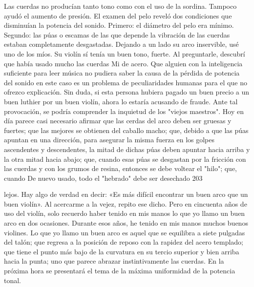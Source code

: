 Las cuerdas no producían tanto tono como con el uso de la sordina. Tampoco ayudó el aumento de presión. El examen del pelo reveló dos condiciones que disminuían la potencia del sonido. Primero: el diámetro del pelo era mínimo. Segundo: las púas o escamas de las que depende la vibración de las cuerdas estaban completamente desgastadas. Dejando a un lado su arco inservible, usé uno de los míos. Su violín sí tenía un buen tono, fuerte. Al preguntarle, descubrí que había usado mucho las cuerdas Mi de acero. Que alguien con la inteligencia suficiente para leer música no pudiera saber la causa de la pérdida de potencia del sonido en este caso es un problema de peculiaridades humanas para el que no ofrezco explicación.
Sin duda, si esta persona hubiera pagado un buen precio a un buen luthier por un buen violín, ahora lo estaría acusando de fraude. Ante tal provocación, se podría comprender la inquietud de los "viejos maestros".
Hoy en día parece casi necesario afirmar que las cerdas del arco deben ser gruesas y fuertes; que las mejores se obtienen del caballo macho; que, debido a que las púas apuntan en una dirección, para asegurar la misma fuerza en los golpes ascendentes y descendentes, la mitad de dichas púas deben apuntar hacia arriba y la otra mitad hacia abajo; que, cuando esas púas se desgastan por la fricción con las cuerdas y con los grumos de resina, entonces se debe voltear el "hilo"; que, cuando
De nuevo usado, todo el "hebrado" debe ser desechado
203

lejos.
Hay algo de verdad en decir: «Es más difícil encontrar un buen arco que un buen violín». Al acercarme a la vejez, repito ese dicho. Pero en cincuenta años de uso del violín, solo recuerdo haber tenido en mis manos lo que yo llamo un buen arco en dos ocasiones. Durante esos años, he tenido en mis manos muchos buenos violines. Lo que yo llamo un buen arco es aquel que se equilibra a siete pulgadas del talón; que regresa a la posición de reposo con la rapidez del acero templado; que tiene el punto más bajo de la curvatura en su tercio superior y bien arriba hacia la punta; uno que parece abrazar instintivamente las cuerdas.
En la próxima hora se presentará el tema de la máxima uniformidad de la potencia tonal.
